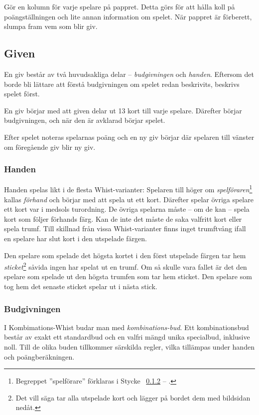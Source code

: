 \documentclass[a4paper]{article} %
\renewcommand{\sectionref}[1]{%
	\ref{sec:#1} -- \nameref{sec:#1}%
}
\begin{document}
	Gör en kolumn för varje spelare på pappret. Detta görs för att hålla koll på poängställningen och lite annan information om spelet. När pappret är förberett, slumpa fram vem som blir giv.

	\subsection{Given}
	En giv består av två huvudsakliga delar -- \emph{budgivningen} och \emph{handen}. Eftersom det borde bli lättare att förstå budgivningen om spelet redan beskrivits, beskrivs spelet först.

	En giv börjar med att given delar ut 13 kort till varje spelare. Därefter börjar budgivningen, och när den är avklarad börjar spelet.

	Efter spelet noteras spelarnas poäng och en ny giv börjar där spelaren till vänster om föregående giv blir ny giv.

	\subsubsection{Handen}
	Handen spelas likt i de flesta Whist-varianter: Spelaren till höger om \emph{spelföraren}\footnote{Begreppet ''spelförare'' förklaras i Stycke~\sectionref{bidding}.} kallas \emph{förhand} och börjar med att spela ut ett kort. Därefter spelar övriga spelare ett kort var i medsols turordning. De övriga spelarna måste -- om de kan -- spela kort som följer förhands färg. Kan de inte det måste de saka valfritt kort eller spela trumf. Till skillnad från vissa Whist-varianter finns inget trumftvång ifall en spelare har slut kort i den utspelade färgen.

	Den spelare som spelade det högsta kortet i den först utspelade färgen tar hem \emph{sticket}\footnote{Det vill säga tar alla utspelade kort och lägger på bordet dem med bildsidan nedåt.} såvida ingen har spelat ut en trumf. Om så skulle vara fallet är det den spelare som spelade ut den högsta trumfen som tar hem sticket. Den spelare som tog hem det senaste sticket spelar ut i nästa stick.

	\subsubsection{Budgivningen}
	\label{sec:bidding}
	I Kombimations-Whist budar man med \emph{kombinations-bud}. Ett kombinationsbud består av exakt ett standardbud och en valfri mängd unika specialbud, inklusive noll. Till de olika buden tillkommer särskilda regler, vilka tillämpas under handen och poängberäkningen.
\end{document}
